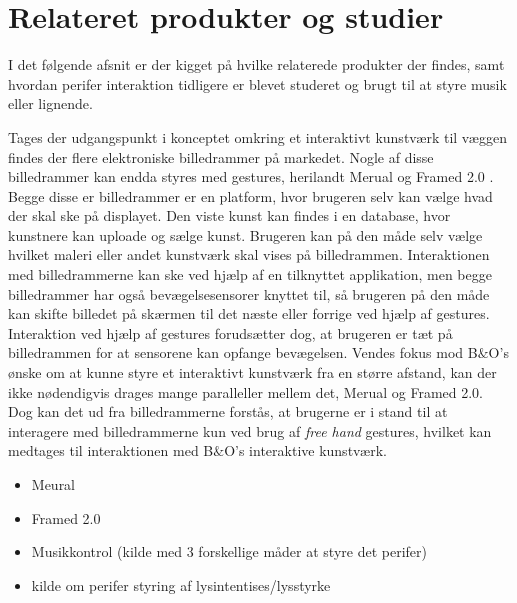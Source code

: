 \section{Relateret produkter og studier}
\label{RelateretProdukterOgStudier}

I det følgende afsnit er der kigget på hvilke relaterede produkter der findes, samt hvordan perifer interaktion tidligere er blevet studeret og brugt til at styre musik eller lignende.

Tages der udgangspunkt i konceptet omkring et interaktivt kunstværk til væggen findes der flere elektroniske billedrammer på markedet. Nogle af disse billedrammer kan endda styres med gestures, herilandt Merual \parencite{WEB:Meural} og Framed 2.0 \parencite{WEB:Framed2.0}. Begge disse er billedrammer er en platform, hvor brugeren selv kan vælge hvad der skal ske på displayet. Den viste kunst kan findes i en database, hvor kunstnere kan uploade og sælge kunst. Brugeren kan på den måde selv vælge hvilket maleri eller andet kunstværk skal vises på billedrammen. Interaktionen med billedrammerne kan ske ved hjælp af en tilknyttet applikation, men begge billedrammer har også bevægelsesensorer knyttet til, så brugeren på den måde kan skifte billedet på skærmen til det næste eller forrige ved hjælp af gestures. Interaktion ved hjælp af gestures forudsætter dog, at brugeren er tæt på billedrammen for at sensorene kan opfange bevægelsen. Vendes fokus mod B$\&$O's ønske om at kunne styre et interaktivt kunstværk fra en større afstand, kan der ikke nødendigvis drages mange paralleller mellem det, Merual og Framed 2.0. Dog kan det ud fra billedrammerne forstås, at brugerne er i stand til at interagere med billedrammerne kun ved brug af \textit{free hand} gestures, hvilket kan medtages til interaktionen med B$\&$O's interaktive kunstværk.

 



%
\begin{itemize}
  \item Meural \parencite{WEB:Meural}
  \item Framed 2.0 
  \item Musikkontrol (kilde med 3 forskellige måder at styre det perifer)
  \item kilde om perifer styring af lysintentises/lysstyrke
\end{itemize}
